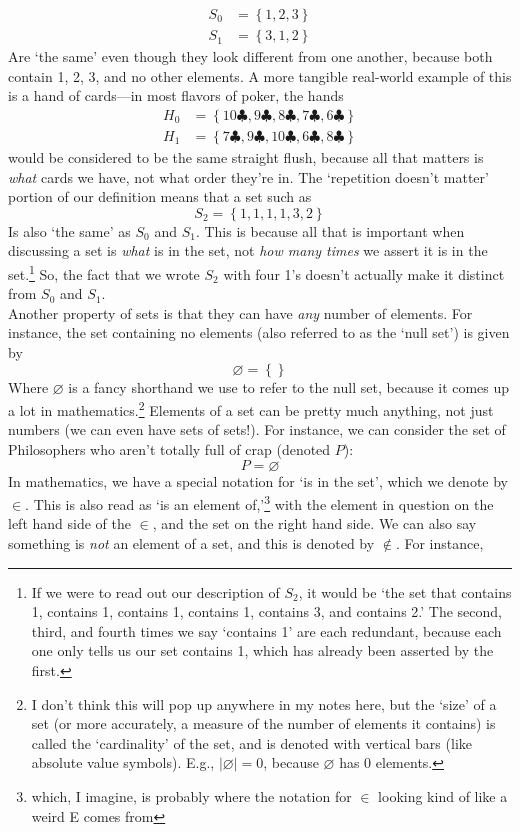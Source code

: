 \documentclass[10pt]{article}
\theoremstyle{definition}
\newcommand{\set}[1]{\left\{ #1 \right\}}
\begin{document}
\begin{align*}
S_0 &= \set{1,2,3}\\
S_1 &= \set{3,1,2}
\end{align*}
Are `the same' even though they look different from one another, because both contain 1, 2, 3, and no other elements.  A more tangible real-world example of this is a hand of cards---in most flavors of poker, the hands
\begin{align*}
H_0 &= \set{10\clubsuit,9\clubsuit, 8\clubsuit, 7\clubsuit, 6\clubsuit}\\
H_1 &= \set{7\clubsuit,9\clubsuit, 10\clubsuit, 6\clubsuit, 8\clubsuit}
\end{align*}
would be considered to be the same straight flush, because all that matters is \emph{what} cards we have, not what order they're in.  The `repetition doesn't matter' portion of our definition means that a set such as
\[S_2 = \set{1,1,1,1,3,2}\] 
Is also `the same' as $S_0$ and $S_1$.  This is because all that is important when discussing a set is \emph{what} is in the set, not \emph{how many times} we assert it is in the set.\footnote{If we were to read out our description of $S_2$, it would be `the set that contains 1, contains 1, contains 1, contains 1, contains 3, and contains 2.'  The second, third, and fourth times we say `contains 1' are each redundant, because each one only tells us our set contains 1, which has already been asserted by the first.}  So, the fact that we wrote $S_2$ with four 1's doesn't actually make it distinct from $S_0$ and $S_1$.  
\\
Another property of sets is that they can have \emph{any} number of elements.  For instance, the set containing no elements (also referred to as the `null set') is given by 
\[\varnothing = \set{}\]
Where $\varnothing$ is a fancy shorthand we use to refer to the null set, because it comes up a lot in mathematics.\footnote{I don't think this will pop up anywhere in my notes here, but the `size' of a set (or more accurately, a measure of the number of elements it contains) is called the `cardinality' of the set, and is denoted with vertical bars (like absolute value symbols).  E.g., $|\varnothing| = 0$, because $\varnothing$ has 0 elements.}  
Elements of a set can be pretty much anything, not just numbers (we can even have sets of sets!).  For instance, we can consider the set of Philosophers who aren't totally full of crap (denoted $P$): 
\[P = \varnothing\]
In mathematics, we have a special notation for `is in the set', which we denote by $\in$.  This is also read as `is an element of,'\footnote{which, I imagine, is probably where the notation for $\in$ looking kind of like a weird E comes from} with the element in question on the left hand side of the $\in$, and the set on the right hand side.  We can also say something is \emph{not} an element of a set, and this is denoted by $\notin$.  For instance, 
\end{document}
